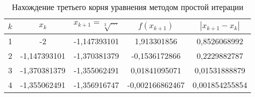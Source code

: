 \begin{table}[]
    \centering
    \begin{tabular}{|c|c|c|c|c|}\hline
$k$	 &	$x_k$	         & 	$x_{k+1}=\sqrt[3]{...}$	  &	$f(x_{k+1})$	 &	$|x_{k+1} - x_k|$	 \\\hline	
1	 &	-2	             &	-1,147393101	          &	1,913301856	     &	0,8526068992	     \\\hline	
2	 &	-1,147393101	 &	-1,370381379	          &	-0,1536172866	 &	0,2229882787	     \\\hline	
3	 &	-1,370381379	 &	-1,355062491	          &	0,01841095071	 &	0,01531888879	     \\\hline	
4	 &	-1,355062491	 &	-1,356916747	          &	-0,002166862467	 &	0,001854255854	     \\\hline	
    \end{tabular}
    \caption{Нахождение третьего корня уравнения методом простой итерации}
    \label{tab:third-root}
\end{table}